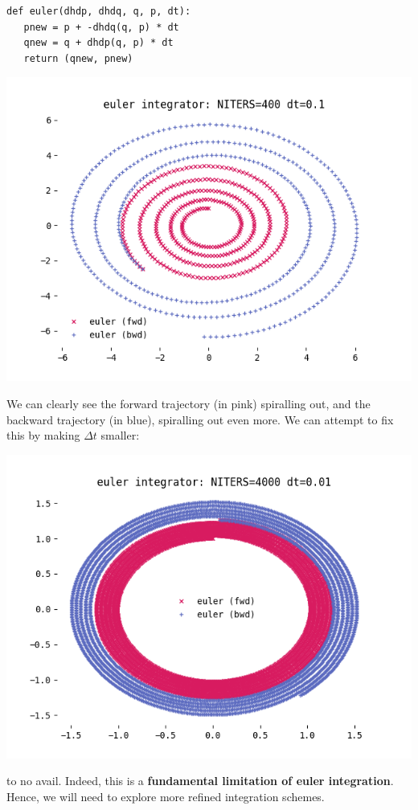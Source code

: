 \documentclass[titlepage]{article}
\begin{document}
\begin{verbatim}
def euler(dhdp, dhdq, q, p, dt):
   pnew = p + -dhdq(q, p) * dt
   qnew = q + dhdp(q, p) * dt
   return (qnew, pnew)
\end{verbatim}

\includegraphics[width=\textwidth/2]{./euler-dt-0-1.png}

We can clearly see the forward trajectory (in pink) spiralling out, and
the backward trajectory (in blue), spiralling out even more. We can attempt
to fix this by making $\Delta t$ smaller:

\includegraphics[width=\textwidth/2]{./euler-dt-0-01.png}


to no avail. Indeed, this is a \textbf{fundamental limitation of euler integration}.
Hence, we will need to explore more refined integration schemes.
\end{document}

